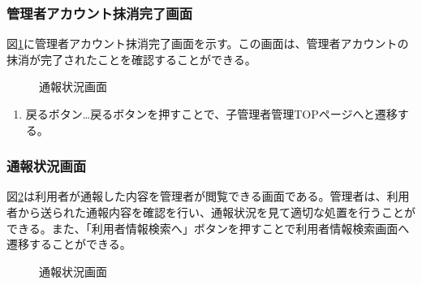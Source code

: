 \documentclass[a4j]{jarticle}
\begin{document}
\subsubsection{管理者アカウント抹消完了画面}
図\ref{fig:delete_admin_ok}に管理者アカウント抹消完了画面を示す。この画面は、管理者アカウントの抹消が完了されたことを確認することができる。
\begin{figure}[H]
\begin{center}
\caption{通報状況画面}
\label{fig:delete_admin_ok}
\end{center}
\end{figure}
\begin{enumerate}
  \renewcommand{\labelenumi}{\textcircled{\scriptsize \theenumi}}


\item 戻るボタン…戻るボタンを押すことで、子管理者管理TOPページへと遷移する。
\end{enumerate}


\subsubsection{通報状況画面}
図\ref{fig:report_admin}は利用者が通報した内容を管理者が閲覧できる画面である。管理者は、利用者から送られた通報内容を確認を行い、通報状況を見て適切な処置を行うことができる。また、「利用者情報検索へ」ボタンを押すことで利用者情報検索画面へ遷移することができる。
\begin{figure}[H]
\begin{center}
\caption{通報状況画面}
\label{fig:report_admin}
\end{center}
\end{figure}
\end{document}
